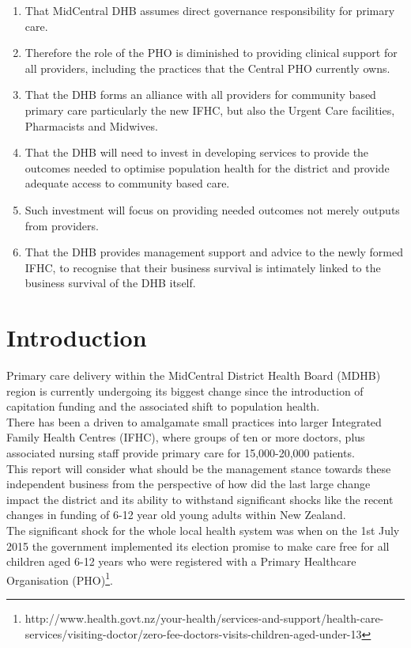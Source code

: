 \documentclass[11pt,a4paper]{article}
\begin{document}
\begin{enumerate}
\item That MidCentral DHB assumes direct governance responsibility for primary care.
\item Therefore the role of the PHO is diminished to providing clinical support for all providers, including the practices that the Central PHO currently owns.
\item That the DHB forms an alliance with all providers for community based primary care particularly the new IFHC, but also the Urgent Care facilities, Pharmacists and Midwives.
\item That the DHB will need to invest in developing services to provide the outcomes needed to optimise population health for the district and provide adequate access to community based care. 
\item Such investment will focus on providing needed outcomes not merely outputs from providers.
\item That the DHB provides management support and advice to the newly formed IFHC, to recognise that their business survival is intimately linked to the business survival of the DHB itself. 
\end{enumerate}


\pagebreak
\section{Introduction}
Primary care delivery within the MidCentral District Health Board (MDHB) region is currently undergoing its biggest change since the introduction of capitation funding and the associated shift to population health.\\

There has been a driven to amalgamate small practices into larger Integrated Family Health Centres (IFHC), where groups of ten or more doctors, plus associated nursing staff provide primary care for 15,000-20,000 patients. \\

This report will consider what should be the management stance towards these independent business from the perspective of how did the last large change impact the district and its ability to withstand significant shocks like the recent changes in funding of 6-12 year old young adults within New Zealand.\\

The significant shock for the whole local health system was when on the 1st July 2015 the government implemented its election promise to make care free for all children aged 6-12 years who were registered with a Primary Healthcare Organisation (PHO)\footnote{http://www.health.govt.nz/your-health/services-and-support/health-care-services/visiting-doctor/zero-fee-doctors-visits-children-aged-under-13}.\\
\end{document}
